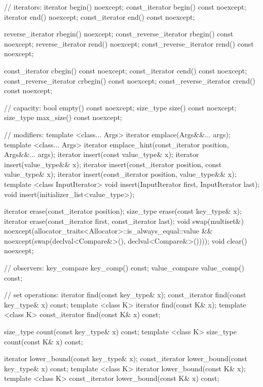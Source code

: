 \begin{codeblock}
{{    // iterators:
    iterator               begin() noexcept;
    const_iterator         begin() const noexcept;
    iterator               end() noexcept;
    const_iterator         end() const noexcept;

    reverse_iterator       rbegin() noexcept;
    const_reverse_iterator rbegin() const noexcept;
    reverse_iterator       rend() noexcept;
    const_reverse_iterator rend() const noexcept;

    const_iterator         cbegin() const noexcept;
    const_iterator         cend() const noexcept;
    const_reverse_iterator crbegin() const noexcept;
    const_reverse_iterator crend() const noexcept;

    // capacity:
    bool      empty() const noexcept;
    size_type size() const noexcept;
    size_type max_size() const noexcept;

    // modifiers:
    template <class... Args> iterator emplace(Args&&... args);
    template <class... Args> iterator emplace_hint(const_iterator position, Args&&... args);
    iterator insert(const value_type& x);
    iterator insert(value_type&& x);
    iterator insert(const_iterator position, const value_type& x);
    iterator insert(const_iterator position, value_type&& x);
    template <class InputIterator>
      void insert(InputIterator first, InputIterator last);
    void insert(initializer_list<value_type>);

    iterator  erase(const_iterator position);
    size_type erase(const key_type& x);
    iterator  erase(const_iterator first, const_iterator last);
    void      swap(multiset&)
      noexcept(allocator_traits<Allocator>::is_always_equal::value &&
               noexcept(swap(declval<Compare&>(), declval<Compare&>())));
    void      clear() noexcept;

    // observers:
    key_compare key_comp() const;
    value_compare value_comp() const;

    // set operations:
    iterator       find(const key_type& x);
    const_iterator find(const key_type& x) const;
    template <class K> iterator       find(const K& x);
    template <class K> const_iterator find(const K& x) const;

    size_type      count(const key_type& x) const;
    template <class K> size_type count(const K& x) const;

    iterator       lower_bound(const key_type& x);
    const_iterator lower_bound(const key_type& x) const;
    template <class K> iterator       lower_bound(const K& x);
    template <class K> const_iterator lower_bound(const K& x) const;

}}
\end{codeblock}
